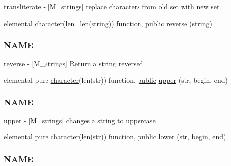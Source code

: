 \begin{DoxyCompactItemize}
\begin{DoxyCompactList}
transliterate -\/ \mbox{[}M\+\_\+strings\mbox{]} replace characters from old set with new set \end{DoxyCompactList}\item 
elemental \hyperlink{option__stopwatch_83_8txt_abd4b21fbbd175834027b5224bfe97e66}{character}(len=len(\hyperlink{what__overview_81_8txt_a74cb7e955273b9f9157b4f0c18a38849}{string})) function, \hyperlink{M__stopwatch_83_8txt_a2f74811300c361e53b430611a7d1769f}{public} \hyperlink{namespacem__strings_ab3e5e7af9e9594fdb544f82736a26f17}{reverse} (\hyperlink{what__overview_81_8txt_a74cb7e955273b9f9157b4f0c18a38849}{string})
\begin{DoxyCompactList}\small\item\em \subsubsection*{N\+A\+ME}

reverse -\/ \mbox{[}M\+\_\+strings\mbox{]} Return a string reversed \end{DoxyCompactList}\item 
elemental pure \hyperlink{option__stopwatch_83_8txt_abd4b21fbbd175834027b5224bfe97e66}{character}(len(str)) function, \hyperlink{M__stopwatch_83_8txt_a2f74811300c361e53b430611a7d1769f}{public} \hyperlink{namespacem__strings_a0953ac5c4d31339fdd8ec3acc9c3c915}{upper} (str, begin, end)
\begin{DoxyCompactList}\small\item\em \subsubsection*{N\+A\+ME}

upper -\/ \mbox{[}M\+\_\+strings\mbox{]} changes a string to uppercase \end{DoxyCompactList}\item 
elemental pure \hyperlink{option__stopwatch_83_8txt_abd4b21fbbd175834027b5224bfe97e66}{character}(len(str)) function, \hyperlink{M__stopwatch_83_8txt_a2f74811300c361e53b430611a7d1769f}{public} \hyperlink{namespacem__strings_a3c7d4be9051206e4b2f72112f9fdc3b4}{lower} (str, begin, end)
\begin{DoxyCompactList}\small\item\em \subsubsection*{N\+A\+ME}


\end{DoxyCompactList}
\end{DoxyCompactItemize}
